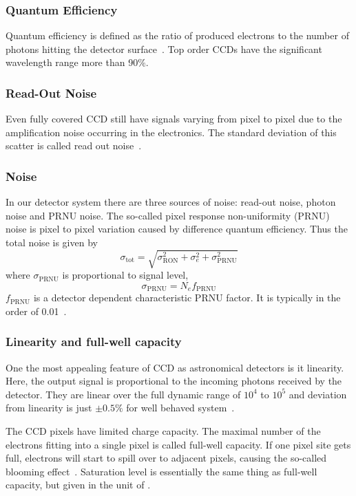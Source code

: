 \subsubsection{Quantum Efficiency}
Quantum efficiency is defined as the ratio of produced electrons to the number of photons hitting the detector surface~\cite{manual}. Top order CCDs have the significant wavelength range more than 90$\% $.

\subsubsection{Read-Out Noise}
Even fully covered CCD still have signals varying from pixel to pixel due to the amplification noise occurring in the electronics. The standard deviation of this scatter is called read out noise~\cite{manual}. 

\subsubsection{Noise}
In our detector system there are three sources of noise: read-out noise, photon noise and PRNU noise. The so-called pixel response non-uniformity (PRNU) noise is pixel to pixel variation caused by difference quantum efficiency. Thus the total noise is given by~\cite{manual}
\begin{equation}
	\sigma_{\text{tot}}=\sqrt{ \sigma^2_{\text{RON}} + \sigma^2_{e} + \sigma^2_\text{PRNU}}
\end{equation}
where $ \sigma_{\text{PRNU}} $ is proportional to signal level,
\begin{equation}
\sigma_{\text{PRNU}}={N}_{e} {f}_{\text{PRNU}}
\label{math:fPRNU}
\end{equation} 
$ {f}_{\text{PRNU}} $ is a detector dependent characteristic PRNU factor. It is typically in the order of 0.01~\cite{manual}.

\subsubsection{Linearity and full-well capacity}
One the most appealing feature of CCD as astronomical detectors is it linearity. Here, the output signal is proportional to the incoming photons received by the detector. They are linear over the full dynamic range of $10^4 $ to $10^5 $ and deviation from linearity is just $\pm 0.5 \%$  for well behaved system~\cite{manual}.

The CCD pixels have limited charge capacity. The maximal number of the electrons fitting into a single pixel is called full-well capacity. If one pixel site gets full, electrons will start to spill over to adjacent pixels, causing the so-called  blooming effect~\cite{manual}. Saturation level is essentially the same thing as full-well capacity, but given in the unit of \si{\ADU}.  
